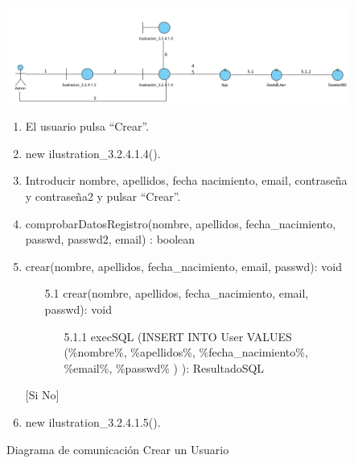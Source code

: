 ﻿\documentclass{report}
\begin{document}
                        \begin{figure}[H]
                \centering
                \includegraphics[width=1.15\textwidth]{img/comunicacion/diagrama2.png}
                \caption{Diagrama de comunicación Crear un Usuario}
            \clearpage
            \begin{enumerate}
                \item El usuario pulsa ``Crear''.
                \item new ilustration\_3.2.4.1.4().
                \item Introducir nombre, apellidos, fecha nacimiento, email, contraseña y contraseña2 y pulsar ``Crear''.
                \item comprobarDatosRegistro(nombre, apellidos, fecha\_nacimiento, passwd, passwd2, email) : boolean 
                \newline
                [Si comprobarDatosRegistro == TRUE]
                \item  crear(nombre, apellidos, fecha\_nacimiento, email, passwd): void
                \begin{enumerate}
                    \item[5.1]  crear(nombre, apellidos, fecha\_nacimiento, email, passwd): void
                        \begin{enumerate}
                            \item[5.1.1] execSQL (INSERT INTO User VALUES (\%nombre\%, \%apellidos\%, \%fecha\_nacimiento\%, \%email\%, \%passwd\% ) ): ResultadoSQL
                        \end{enumerate}
                    \end{enumerate}
                    [Si No]
                \item new ilustration\_3.2.4.1.5().
            \end{enumerate}
            \end{figure}
            
\end{document}
